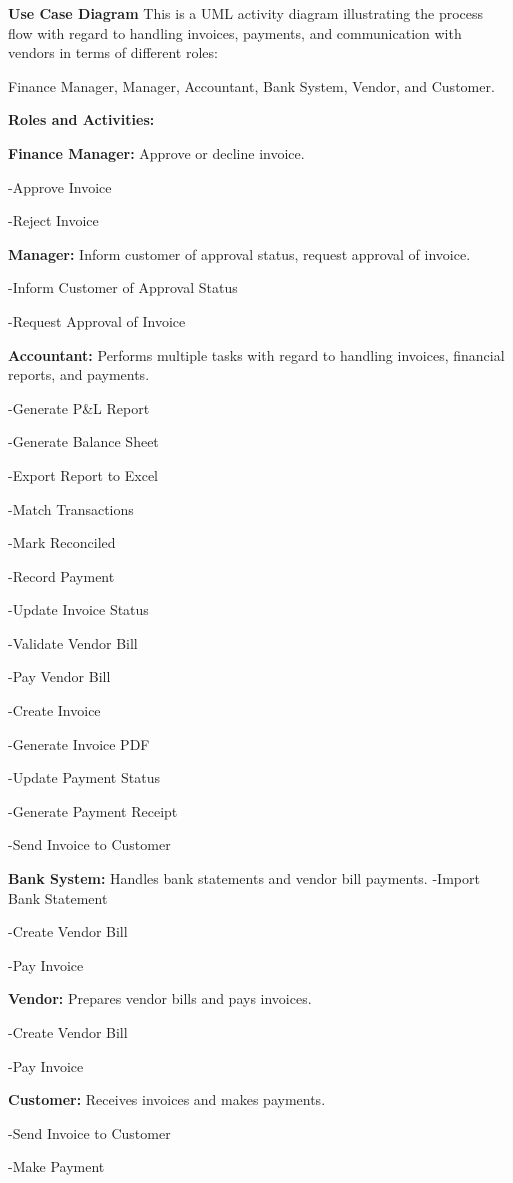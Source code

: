 \documentclass[11pt,a4paper]{article}
\begin{document}
\hfill
\begin{minipage}{0.45\textwidth}
    \textbf{Use Case Diagram}
    This is a UML activity diagram illustrating the process flow with regard to handling invoices, payments, and communication with vendors in terms of different roles: 
    \medskip
    
    Finance Manager, Manager, Accountant, Bank System, Vendor, and Customer.
    \medskip

    \textbf{Roles and Activities:}

    \textbf{Finance Manager:}
    Approve or decline invoice.

	-Approve Invoice

	-Reject Invoice
    \medskip

    \textbf{Manager:} Inform customer of approval status, request approval of invoice.

    -Inform Customer of Approval Status	

	-Request Approval of Invoice
    \medskip

    \textbf{Accountant:} Performs multiple tasks with regard to handling invoices, financial reports, and payments.

    -Generate P\&L Report

	-Generate Balance Sheet

	-Export Report to Excel

	-Match Transactions

	-Mark Reconciled

	-Record Payment

	-Update Invoice Status

	-Validate Vendor Bill

	-Pay Vendor Bill

	-Create Invoice

	-Generate Invoice PDF

	-Update Payment Status

	-Generate Payment Receipt

	-Send Invoice to Customer
    \medskip

    \textbf{Bank System:} Handles bank statements and vendor bill payments.
    -Import Bank Statement

	-Create Vendor Bill

	-Pay Invoice
    \medskip

    \textbf{Vendor:} Prepares vendor bills and pays invoices.

	-Create Vendor Bill

	-Pay Invoice
    \medskip

    \textbf{Customer:} Receives invoices and makes payments.

    -Send Invoice to Customer

	-Make Payment
    \medskip

\end{minipage}
\end{document}
